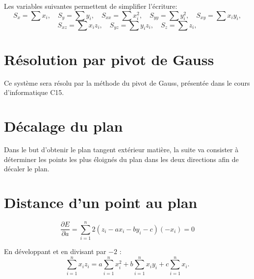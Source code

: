 Les variables suivantes permettent de simplifier l'écriture:
\[
S_x = \sum x_i, \quad
S_y = \sum y_i, \quad
S_{xx} = \sum x_i^2, \quad
S_{yy} = \sum y_i^2, \quad
S_{xy} = \sum x_i y_i,
\]
\[
S_{xz} = \sum x_i z_i, \quad
S_{yz} = \sum y_i z_i, \quad
S_z = \sum z_i,
\]


\section{Résolution par pivot de Gauss}

Ce système sera résolu par la méthode du pivot de Gauss, présentée dans le cours d'informatique C15.


\section{Décalage du plan}

Dans le but d'obtenir le plan tangent extérieur matière, la suite va consister à déterminer les points les plus éloignés du plan dans les deux directions afin de décaler le plan.





\section{Distance d'un point au plan}


 

\[
\frac{\partial E}{\partial a}
= \sum_{i=1}^n 2\left( z_i - a x_i - b y_i - c \right)(-x_i) = 0
\]

En développant et en divisant par $-2$ :
\[
\sum_{i=1}^n x_i z_i = a \sum_{i=1}^n x_i^2 + b \sum_{i=1}^n x_i y_i + c \sum_{i=1}^n x_i.
\]

